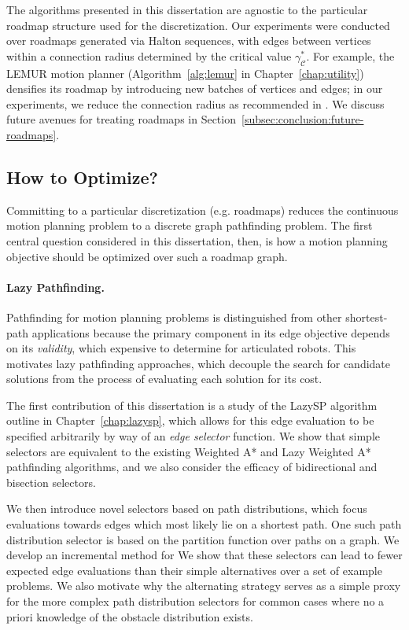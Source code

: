 The algorithms presented in this dissertation are agnostic to the
particular roadmap structure used for the discretization.
Our experiments were conducted over roadmaps generated
via Halton sequences,
with edges between vertices within a connection radius
determined by the critical value $\gamma^*_{\mathcal{C}}$.
For example, the LEMUR motion planner
(Algorithm~\ref{alg:lemur} in Chapter~\ref{chap:utility})
densifies its roadmap by introducing new batches of
vertices and edges;
in our experiments,
we reduce the connection radius as recommended in
\citep{janson2015deterministicsampling}.
We discuss future avenues for treating roadmaps
in Section~\ref{subsec:conclusion:future-roadmaps}.

\subsection{How to Optimize?}
Committing to a particular discretization (e.g. roadmaps)
reduces the continuous motion planning problem
to a discrete graph pathfinding problem.
The first central question considered in this dissertation, then,
is how a motion planning objective should be optimized over
such a roadmap graph.

\paragraph{Lazy Pathfinding.}
Pathfinding for motion planning problems is distinguished from other
shortest-path applications because
the primary component in its edge objective
depends on its \emph{validity},
which expensive to determine for articulated robots.
This motivates lazy pathfinding approaches,
which decouple the search for candidate solutions
from the process of evaluating each solution for its cost.

The first contribution of this dissertation is a study of
the LazySP algorithm outline in Chapter~\ref{chap:lazysp},
which allows for this edge evaluation to be specified arbitrarily
by way of an \emph{edge selector} function.
We show that simple selectors are equivalent to the existing
Weighted A* and Lazy Weighted A* pathfinding algorithms,
and we also consider the efficacy of bidirectional
and bisection selectors.

We then introduce novel selectors based on path distributions,
which focus evaluations towards edges which most likely lie on
a shortest path.
One such path distribution selector is based on the partition
function over paths on a graph.
We develop an incremental method for 
We show that these selectors can lead to fewer expected edge
evaluations than their simple alternatives over a set of example
problems.
We also motivate why the alternating strategy serves as
a simple proxy for the more complex path distribution selectors
for common cases where no a priori knowledge of the obstacle
distribution exists.

